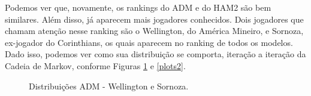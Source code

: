 Podemos ver que, novamente, os rankings do ADM e do HAM2 são bem similares. Além disso, já aparecem mais jogadores conhecidos. Dois jogadores que chamam atenção nesse ranking são o Wellington, do América Mineiro, e Sornoza, ex-jogador do Corinthians, os quais aparecem no ranking de todos os modelos. Dado isso, podemos ver como sua distribuição se comporta, iteração a iteração da Cadeia de Markov, conforme Figuras \ref{plots1} e \ref{plots2}.
\begin{figure}[H]
    \caption{Distribuições ADM - Wellington e Sornoza.}
    \label{plots1}
\end{figure}

